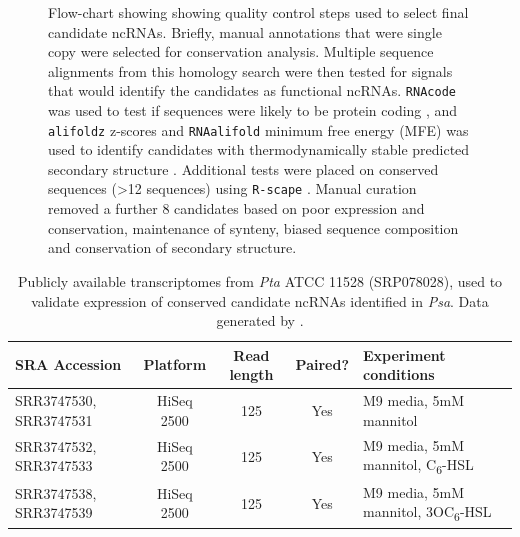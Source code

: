 \begin{figure}[H]
\begin{minipage}{0.6\textwidth}
\end{minipage}
\begin{minipage}{0.39\textwidth}
    \caption[Flow-chart showing showing quality control steps used to select final candidate ncRNAs]{Flow-chart showing showing quality control steps used to select final candidate ncRNAs. Briefly, manual annotations that were single copy were selected for conservation analysis. Multiple sequence alignments from this homology search were then tested for signals that would identify the candidates as functional ncRNAs. \texttt{RNAcode} was used to test if sequences were likely to be protein coding \citep{Washietl2011x}, and \texttt{alifoldz} z-scores and \texttt{RNAalifold} minimum free energy (MFE) was used to identify candidates with thermodynamically stable predicted secondary structure \citep{Bernhart_Hofacker_Will_Gruber_Stadler_2008x,Washietl2004-pk}. Additional tests were placed on conserved sequences (>12 sequences) using \texttt{R-scape} \citep{Rivas_Clements_Eddy_2017x}. Manual curation removed a further 8 candidates based on poor expression and conservation, maintenance of synteny, biased sequence composition and conservation of secondary structure.}
    \label{fig:psa_flowchart}
\end{minipage}
\end{figure}




\begin{table}[H]
    \footnotesize
    \centering
    \begin{tabular}{p{3cm}cccp{6cm}}\toprule
SRA Accession &  Platform & Read length & Paired? & Experiment conditions\\\midrule
SRR3747530, SRR3747531&HiSeq 2500& 125 &Yes & M9 media, 5mM mannitol\\
SRR3747532, SRR3747533& HiSeq 2500& 125 &Yes & M9 media, 5mM mannitol, C\textsubscript{6}-HSL\\
SRR3747538, SRR3747539& HiSeq 2500& 125 &Yes & M9 media, 5mM mannitol, 3OC\textsubscript{6}-HSL\\

\bottomrule
    \end{tabular}
    \caption[\textit{Pta} transcriptomes used to validate candidate ncRNA expression (SRP078028)]{Publicly available transcriptomes from \textit{Pta} ATCC 11528 (SRP078028), used to validate expression of conserved candidate ncRNAs identified in \textit{Psa}. Data generated by \cite{Cheng2018-eo}. }
    \label{tab:tabaci_transcriptomes}
\end{table}

